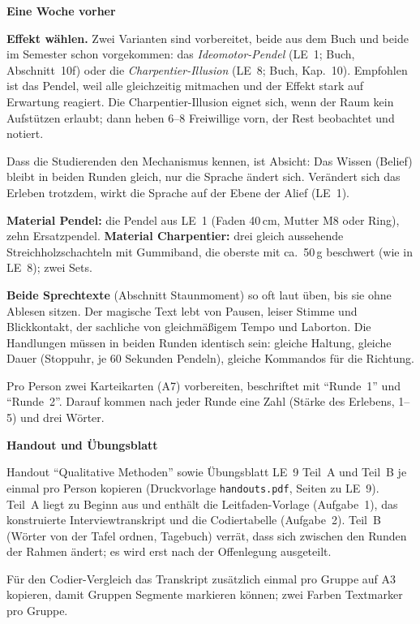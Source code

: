 \begin{vorbereitung}
\textbf{Eine Woche vorher}
\begin{checkliste}
  \item \textbf{Effekt wählen.} Zwei Varianten sind vorbereitet, beide
    aus dem Buch und beide im Semester schon vorgekommen:
    das \emph{Ideomotor-Pendel} (LE~1; Buch, Abschnitt~10f) oder die
    \emph{Charpentier-Illusion} (LE~8; Buch, Kap.~10). Empfohlen ist das
    Pendel, weil alle gleichzeitig mitmachen und der Effekt stark auf
    Erwartung reagiert. Die Charpentier-Illusion eignet sich, wenn der
    Raum kein Aufstützen erlaubt; dann heben 6--8 Freiwillige vorn,
    der Rest beobachtet und notiert.
  \item Dass die Studierenden den Mechanismus kennen, ist Absicht: Das
    Wissen (Belief) bleibt in beiden Runden gleich, nur die Sprache
    ändert sich. Verändert sich das Erleben trotzdem, wirkt die Sprache
    auf der Ebene der Alief (LE~1).
  \item \textbf{Material Pendel:} die Pendel aus LE~1 (Faden 40\,cm,
    Mutter M8 oder Ring), zehn Ersatzpendel.
    \textbf{Material Charpentier:} drei gleich aussehende
    Streichholzschachteln mit Gummiband, die oberste mit ca.\ 50\,g
    beschwert (wie in LE~8); zwei Sets.
  \item \textbf{Beide Sprechtexte} (Abschnitt Staunmoment) so oft laut
    üben, bis sie ohne Ablesen sitzen. Der magische Text lebt von
    Pausen, leiser Stimme und Blickkontakt, der sachliche von gleichmäßigem
    Tempo und Laborton. Die Handlungen müssen in beiden Runden identisch
    sein: gleiche Haltung, gleiche Dauer (Stoppuhr, je 60 Sekunden
    Pendeln), gleiche Kommandos für die Richtung.
  \item Pro Person zwei Karteikarten (A7) vorbereiten, beschriftet mit
    \enquote{Runde~1} und \enquote{Runde~2}. Darauf kommen nach jeder
    Runde eine Zahl (Stärke des Erlebens, 1--5) und drei Wörter.
\end{checkliste}

\textbf{Handout und Übungsblatt}
\begin{checkliste}
  \item Handout \enquote{Qualitative Methoden} sowie Übungsblatt LE~9
    Teil~A und Teil~B je einmal pro Person kopieren (Druckvorlage
    \texttt{handouts.pdf}, Seiten zu LE~9). Teil~A liegt zu Beginn aus
    und enthält die Leitfaden-Vorlage (Aufgabe~1), das konstruierte
    Interviewtranskript und die Codiertabelle (Aufgabe~2). Teil~B
    (Wörter von der Tafel ordnen, Tagebuch) verrät, dass sich zwischen
    den Runden der Rahmen ändert; es wird erst nach der Offenlegung
    ausgeteilt.
  \item Für den Codier-Vergleich das Transkript zusätzlich einmal pro
    Gruppe auf A3 kopieren, damit Gruppen Segmente markieren können;
    zwei Farben Textmarker pro Gruppe.
\end{checkliste}


\end{vorbereitung}
